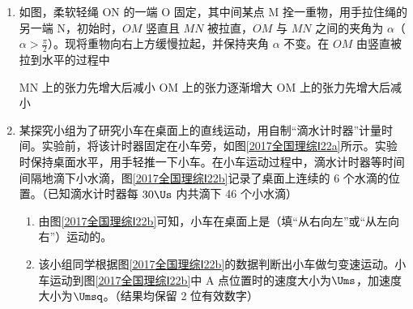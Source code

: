 \documentclass[\gkver]{gaokaozhenti}
\begin{document}
\begin{enumerate}

\item
如图，柔软轻绳 ON 的一端 O 固定，其中间某点 M 拴一重物，用手拉住绳的另一端 N，初始时，$OM$ 竖直且 $MN$ 被拉直，$OM$ 与 $MN$ 之间的夹角为 $\alpha$（$\alpha>\frac{\pi}{2}$）。现将重物向右上方缓慢拉起，并保持夹角 $\alpha$ 不变。在 $OM$ 由竖直被拉到水平的过程中

\onepicture[h=2.79cm]{}

{MN 上的张力先增大后减小}
{OM 上的张力逐渐增大}
{OM 上的张力先增大后减小}


\item
某探究小组为了研究小车在桌面上的直线运动，用自制“滴水计时器”计量时间。实验前，将该计时器固定在小车旁，如图\ref{2017全国理综Ⅰ22a}所示。实验时保持桌面水平，用手轻推一下小车。在小车运动过程中，滴水计时器等时间间隔地滴下小水滴，图\ref{2017全国理综Ⅰ22b}记录了桌面上连续的 6 个水滴的位置。（已知滴水计时器每 $30\Us$ 内共滴下 46 个小水滴）

\begin{enumerate}
	\item
	由图\ref{2017全国理综Ⅰ22b}可知，小车在桌面上是（填“从右向左”或“从左向右”）运动的。

	\item
	该小组同学根据图\ref{2017全国理综Ⅰ22b}的数据判断出小车做匀变速运动。小车运动到图\ref{2017全国理综Ⅰ22b}中 A 点位置时的速度大小为$\Ums$，加速度大小为$\Umsq$。（结果均保留 2 位有效数字）
\end{enumerate}


\end{enumerate}
\end{document}
